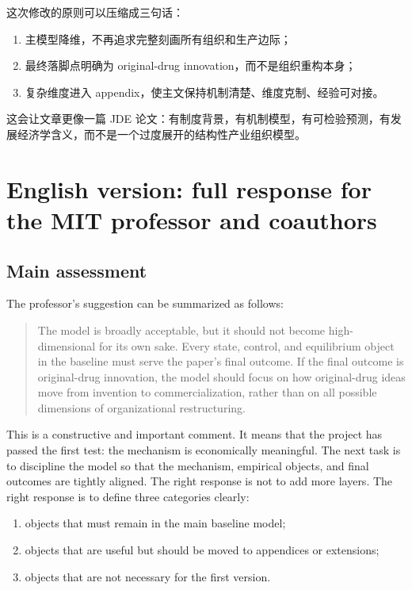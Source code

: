 \documentclass[12pt]{article}
\begin{document}
这次修改的原则可以压缩成三句话：
\begin{enumerate}
    \item 主模型降维，不再追求完整刻画所有组织和生产边际；
    \item 最终落脚点明确为 original-drug innovation，而不是组织重构本身；
    \item 复杂维度进入 appendix，使主文保持机制清楚、维度克制、经验可对接。
\end{enumerate}

这会让文章更像一篇 JDE 论文：有制度背景，有机制模型，有可检验预测，有发展经济学含义，而不是一个过度展开的结构性产业组织模型。

\newpage

\section{English version: full response for the MIT professor and coauthors}

\subsection{Main assessment}

The professor's suggestion can be summarized as follows:
\begin{quote}
The model is broadly acceptable, but it should not become high-dimensional for its own sake. Every state, control, and equilibrium object in the baseline must serve the paper's final outcome. If the final outcome is original-drug innovation, the model should focus on how original-drug ideas move from invention to commercialization, rather than on all possible dimensions of organizational restructuring.
\end{quote}

This is a constructive and important comment. It means that the project has passed the first test: the mechanism is economically meaningful. The next task is to discipline the model so that the mechanism, empirical objects, and final outcomes are tightly aligned. The right response is not to add more layers. The right response is to define three categories clearly:
\begin{enumerate}
    \item objects that must remain in the main baseline model;
    \item objects that are useful but should be moved to appendices or extensions;
    \item objects that are not necessary for the first version.
\end{enumerate}
\end{document}
